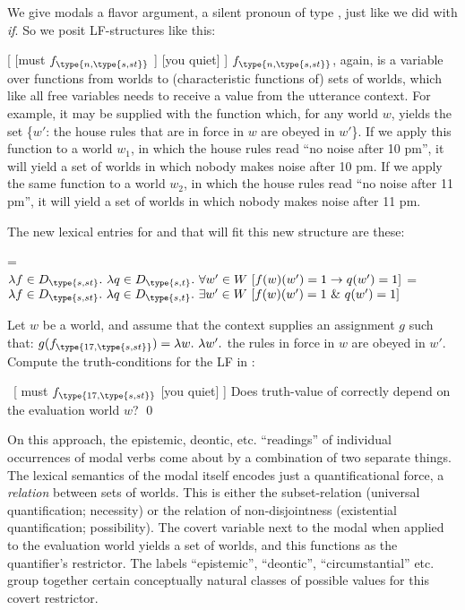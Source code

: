 We give modals a flavor argument, a silent pronoun of type , just
like we did with \emph{if}. So we posit LF-structures like this:

\ex \label{newlf} [ [must $f_{\type{n,\type{s,st}}}$ ] [you quiet] ] \xe
%
$f_{\type{n,\type{s,st}}}$, again, is a variable over functions from worlds to
(characteristic functions of) sets of worlds, which \dash like all free
variables \dash needs to receive a value from the utterance context. For
example, it may be supplied with the function which, for any world $w$, yields
the set \{$w'$: the house rules that are in force in $w$ are obeyed in $w'$\}.
If we apply this function to a world $w_{1}$, in which the house rules read ``no
noise after 10 pm'', it will yield a set of worlds in which nobody makes noise
after 10 pm. If we apply the same function to a world $w_{2}$, in which the
house rules read ``no noise after 11 pm'', it will yield a set of worlds in
which nobody makes noise after 11 pm.

%
The new lexical entries for  and  that will fit
this new structure are these:

\pex\label{ex:modal-sst}
\a {} = \\
$\lambda f\in D_{\type{s,st}}.\ \lambda q\in D_{\type{s,t}}.\ \forall w'\in W\
[f(w)(w') =1 \rightarrow q(w')=1]$%
\a {} = \\
$\lambda f\in D_{\type{s,st}}.\ \lambda q\in D_{\type{s,t}}.\ \exists w'\in
W\ [f(w)(w')=1\ \&\ q(w')=1]$%
\xe

\begin{exercise}
  Let $w$ be a world, and assume that the context supplies an assignment $g$
  such that:
  \ex $g(f_{\type{17,\type{s,st}}}) = \lambda w.\ \lambda w'.$ the rules
  in force in $w$ are obeyed in $w'$.\label{ex:deontic-f} \xe
  Compute the truth-conditions for the LF in \Next:

  \ex\ [ must $f_{\type{17,\type{s,st}}}$  [you quiet] ] \xe
  Does truth-value of \Last correctly depend on the evaluation world $w$? \qed
\end{exercise}


On this approach, the epistemic, deontic, etc. ``readings'' of individual
occurrences of modal verbs come about by a combination of two separate things.
The lexical semantics of the modal itself encodes just a quantificational force,
a \emph{relation} between sets of worlds. This is either the subset-relation
(universal quantification; necessity) or the relation of non-disjointness
(existential quantification; possibility). The covert variable next to the modal
when applied to the evaluation world yields a set of worlds, and this functions
as the quantifier's restrictor. The labels ``epistemic'', ``deontic'',
``circumstantial'' etc. group together certain conceptually natural classes of
possible values for this covert restrictor.

